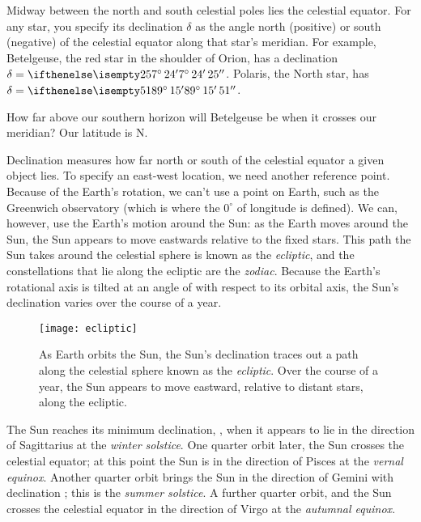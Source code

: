 Midway between the north and south celestial poles lies the celestial equator.  For any star, you specify its declination $\delta$ as the angle north (positive) or south (negative) of the celestial equator along that star's meridian.  For example, Betelgeuse, the red star in the shoulder of Orion, has a declination $\delta = \dec{7}{24}{25}$.  Polaris, the North star, has $\delta = \dec{89}{15}{51}$.

\begin{exercisebox}
How far above our southern horizon will Betelgeuse be when it crosses our meridian? Our latitude is N.
\end{exercisebox}

Declination measures how far north or south of the celestial equator a given object lies. To specify an east-west location, we need another reference point.  Because of the Earth's rotation, we can't use a point on Earth, such as the Greenwich observatory (which is where the $0^{\circ}$ of longitude is defined).  We can, however, use the Earth's motion around the Sun: as the Earth moves around the Sun, the Sun appears to move eastwards relative to the fixed stars. This path the Sun takes around the celestial sphere is known as the \emph{ecliptic}, and the constellations that lie along the ecliptic are the \emph{zodiac}.
Because the Earth's rotational axis is tilted at an angle of  with respect to its orbital axis, the Sun's declination varies over the course of a year.   

\begin{figure}[hb]
\texttt{[image: ecliptic]}
\caption[The ecliptic]{As Earth orbits the Sun, the Sun's declination traces out a path along the celestial sphere known as the \emph{ecliptic}.  Over the course of a year, the Sun appears to move eastward, relative to distant stars, along the ecliptic.}
\label{f.ecliptic}
\end{figure}

The Sun reaches its minimum declination, , when it appears to lie in the direction of Sagittarius at the \emph{winter solstice}.  One quarter orbit later, the Sun crosses the celestial equator; at this point the Sun is in the direction of Pisces at the \emph{vernal equinox}. Another quarter orbit brings the Sun in the direction of Gemini with declination ; this is the \emph{summer solstice}. A further quarter orbit, and the Sun crosses the celestial equator in the direction of Virgo at the \emph{autumnal equinox}.

